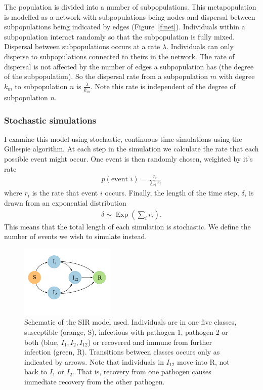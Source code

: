 The population is divided into a number of subpopulations.
This metapopulation is modelled as a network with subpopulations being nodes and dispersal between subpopulations being indicated by edges (Figure~\ref{f:net}).
Individuals within a subpopulation interact randomly so that the subpopulation is fully mixed.
Dispersal between subpopulations occurs at a rate $\lambda$.
Individuals can only disperse to subpopulations connected to theirs in the network.
The rate of dispersal is not affected by the number of edges a subpopulation has (the degree of the subpopulation).
So the dispersal rate from a subpopulation $m$ with degree $k_m$ to subpopulation $n$ is $\frac{\lambda}{k_m}$.
Note this rate is independent of the degree of subpopulation $n$.





\subsubsection{Stochastic simulations}

I examine this model using stochastic, continuous time simulations using the Gillespie algorithm.
At each step in the simulation we calculate the rate that each possible event might occur.
One event is then randomly chosen, weighted by it's rate
\begin{align}
  p(\text{event } i) = \frac{r_i}{\sum_i r_i}
\end{align}
where $r_i$ is the rate that event $i$ occurs.
Finally, the length of the time step, $\delta$, is drawn from an exponential distribution 
\begin{align}
  \delta \sim \operatorname{Exp}\left(\sum_i r_i  \right).
\end{align}
This means that the total length of each simulation is stochastic. 
We define the number of events we wish to simulate instead.


\begin{figure}[t]
\centering
  \includegraphics[width=0.4\textwidth]{imgs/SIRoption1.pdf}
  \caption{
Schematic of the SIR model used. 
Individuals are in one five classes, susceptible (orange, S), infectious with pathogen 1, pathogen 2 or both (blue, $I_1, I_2, I_{12}$) or recovered and immune from further infection (green, R).
Transitions between classes occurs only as indicated by arrows.
Note that individuals in $I_{12}$ move into R, not back to $I_1$ or $I_2$. 
That is, recovery from one pathogen causes immediate recovery from the other pathogen.
}
  \label{f:sir}
\end{figure}


